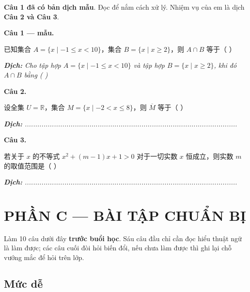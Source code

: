 \documentclass[11pt, a4paper]{article}
\begin{document}
\textbf{Câu 1 đã có bản dịch mẫu}. Đọc để nắm cách xử lý. Nhiệm vụ của em là dịch \textbf{Câu 2 và Câu 3}.

\textbf{Câu 1 — mẫu.}

已知集合 $A=\{x\mid -1\le x<10\}$，集合 $B=\{x\mid x\ge2\}$，则 $A\cap B$ 等于（ ）

\noindent\emph{\textbf{Dịch:} Cho tập hợp $A=\{x \mid -1 \le x < 10\}$ và tập hợp $B=\{x \mid x \ge 2\}$, khi đó $A \cap B$ bằng ( )}

\textbf{Câu 2.}

设全集 $U=\mathbb{R}$，集合 $M=\{x\mid -2<x\le8\}$，则 $\overline{M}$ 等于（ ）

\noindent\emph{\textbf{Dịch:} ......................................................................................................}

\textbf{Câu 3.}

若关于 $x$ 的不等式 $x^2+(m-1)x+1>0$ 对于一切实数 $x$ 恒成立，则实数 $m$ 的取值范围是（ ）

\noindent\emph{\textbf{Dịch:} ......................................................................................................}

\section{PHẦN C — BÀI TẬP CHUẨN BỊ}

Làm 10 câu dưới đây \textbf{trước buổi học}. Sáu câu đầu chỉ cần đọc hiểu thuật ngữ là làm được; các câu cuối đòi hỏi biến đổi, nếu chưa làm được thì ghi lại chỗ vướng mắc để hỏi trên lớp.

\subsection{Mức dễ}
\end{document}
